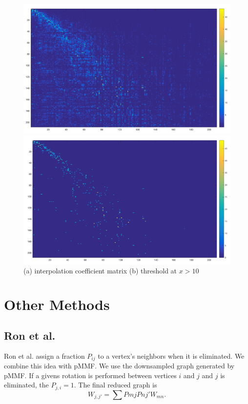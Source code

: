 \documentclass[a4paper]{article}
\begin{document}
\begin{figure}[H]
\centering
\includegraphics[width = 12 cm]{0629/coefficients_zero_diagonal_4_stages}

\includegraphics[width = 12 cm]{0629/coefficients_zero_diagonal_4_stages_threshold}

\caption{ (a) interpolation coefficient matrix (b) threshold at $x>10$ }
\end{figure}

\newpage


\section{Other Methods}

\subsection{Ron et al.}

Ron et al. assign a fraction $P_{ij}$ to a vertex's neighbors when it is eliminated. We combine this idea with pMMF. We use the downsampled graph generated by pMMF. If a givens rotation is performed between vertices $i$ and $j$ and $j$ is eliminated, the $P_{j, i} = 1$. The final reduced graph is $$W_{j,j'} = \sum P{mj} P{nj'} W_{mn}.$$
\end{document}
